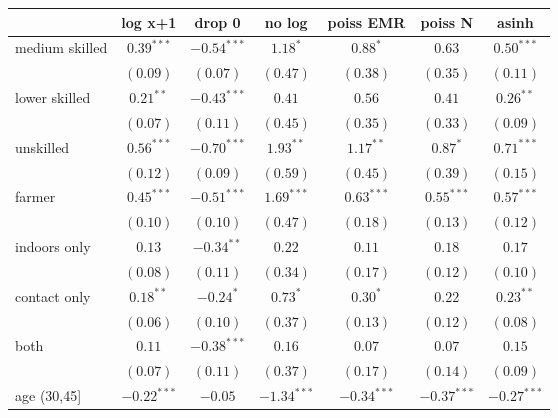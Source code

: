 
\begin{table}[h!]
\begin{center}
\begin{small}
\begin{tabular}{l c c c c c c}
\hline
 & log x+1 & drop 0 & no log & poiss EMR & poiss N  & asinh \\
\hline
medium skilled & $0.39^{***}$  & $-0.54^{***}$ & $1.18^{*}$    & $0.88^{*}$    & $0.63$        & $0.50^{***}$  \\
               & $(0.09)$      & $(0.07)$      & $(0.47)$      & $(0.38)$      & $(0.35)$      & $(0.11)$      \\
lower skilled  & $0.21^{**}$   & $-0.43^{***}$ & $0.41$        & $0.56$        & $0.41$        & $0.26^{**}$   \\
               & $(0.07)$      & $(0.11)$      & $(0.45)$      & $(0.35)$      & $(0.33)$      & $(0.09)$      \\
unskilled      & $0.56^{***}$  & $-0.70^{***}$ & $1.93^{**}$   & $1.17^{**}$   & $0.87^{*}$    & $0.71^{***}$  \\
               & $(0.12)$      & $(0.09)$      & $(0.59)$      & $(0.45)$      & $(0.39)$      & $(0.15)$      \\
farmer         & $0.45^{***}$  & $-0.51^{***}$ & $1.69^{***}$  & $0.63^{***}$  & $0.55^{***}$  & $0.57^{***}$  \\
               & $(0.10)$      & $(0.10)$      & $(0.47)$      & $(0.18)$      & $(0.13)$      & $(0.12)$      \\
indoors only   & $0.13$        & $-0.34^{**}$  & $0.22$        & $0.11$        & $0.18$        & $0.17$        \\
               & $(0.08)$      & $(0.11)$      & $(0.34)$      & $(0.17)$      & $(0.12)$      & $(0.10)$      \\
contact only   & $0.18^{**}$   & $-0.24^{*}$   & $0.73^{*}$    & $0.30^{*}$    & $0.22$        & $0.23^{**}$   \\
               & $(0.06)$      & $(0.10)$      & $(0.37)$      & $(0.13)$      & $(0.12)$      & $(0.08)$      \\
both           & $0.11$        & $-0.38^{***}$ & $0.16$        & $0.07$        & $0.07$        & $0.15$        \\
               & $(0.07)$      & $(0.11)$      & $(0.37)$      & $(0.17)$      & $(0.14)$      & $(0.09)$      \\
age (30,45]    & $-0.22^{***}$ & $-0.05$       & $-1.34^{***}$ & $-0.34^{***}$ & $-0.37^{***}$ & $-0.27^{***}$ \\

\end{tabular}
\end{small}
\end{center}
\end{table}
